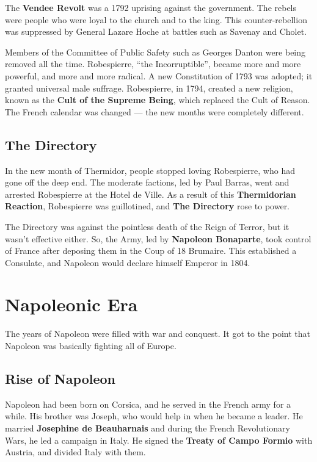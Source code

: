 The \textbf{Vendee Revolt} was a 1792 uprising against the government.
The rebels were people who were loyal to the church and to the king.
This counter-rebellion was suppressed by General Lazare Hoche at battles such as Savenay and Cholet.

Members of the Committee of Public Safety such as Georges Danton were being removed all the time.
Robespierre, ``the Incorruptible'', became more and more powerful, and more and more radical.
A new Constitution of 1793 was adopted; it granted universal male suffrage.
Robespierre, in 1794, created a new religion, known as the \textbf{Cult of the Supreme Being},
which replaced the Cult of Reason.
The French calendar was changed --- the new months were completely different.

\subsection*{The Directory}

In the new month of Thermidor, people stopped loving Robespierre, who had gone off the deep end.
The moderate factions, led by Paul Barras, went and arrested Robespierre at the Hotel de Ville.
As a result of this \textbf{Thermidorian Reaction}, Robespierre was guillotined,
and \textbf{The Directory} rose to power.

The Directory was against the pointless death of the Reign of Terror, but it wasn't effective either.
So, the Army, led by \textbf{Napoleon Bonaparte},
took control of France after deposing them in the Coup of 18 Brumaire.
This established a Consulate, and Napoleon would declare himself Emperor in 1804.

\section{Napoleonic Era}

The years of Napoleon were filled with war and conquest.
It got to the point that Napoleon was basically fighting all of Europe.

\subsection*{Rise of Napoleon}

Napoleon had been born on Corsica, and he served in the French army for a while.
His brother was Joseph, who would help in when he became a leader.
He married \textbf{Josephine de Beauharnais} and during the French Revolutionary Wars,
he led a campaign in Italy.
He signed the \textbf{Treaty of Campo Formio} with Austria, and divided Italy with them.


